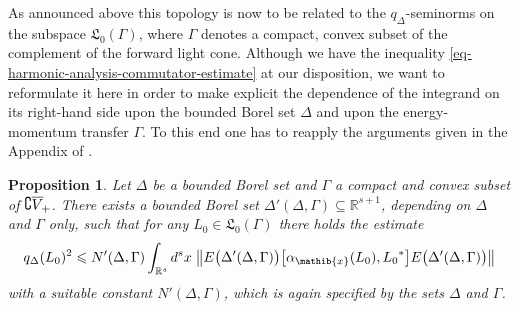 \documentclass[11pt,twoside,openright]{report}
\theoremstyle{definition}
\theoremstyle{plain}
\newtheorem{Pro}[Def]{Proposition}
\theoremstyle{remark}
\theoremstyle{assumption}
\newcommand{\bcomm}[2]{\bigl[ #1 , #2 \bigr]}
\newcommand{\bnorm}[1]{\bigl\lVert #1 \bigr\rVert}
\newcommand{\qD}{q_\Delta}
\newcommand{\qDx}[1]{q_\Delta ( #1 )}
\newcommand{\Lfrak}{\mathfrak{L}}
\newcommand{\Rs}{\mathbb{R}^s}
\newcommand{\Rsone}{\mathbb{R}^{s + 1}}
\newcommand{\fwcone}{\overline{V}_{\negthinspace +}}
\newcommand{\EDG}{E \bigl( \Delta' ( \Delta , \Gamma ) \bigr)}
\newcommand{\aibx}{\alpha_\mathib{x}}
\begin{document}
As announced above this topology is now to be related to the
$\qD$-seminorms on the subspace $\Lfrak_0 ( \Gamma )$, where $\Gamma$
denotes a compact, convex subset of the complement of the forward
light cone. Although we have the inequality
\eqref{eq-harmonic-analysis-commutator-estimate} at our disposition,
we want to reformulate it here in order to make explicit the
dependence of the integrand on its right-hand side upon the bounded
Borel set $\Delta$ and upon the energy-momentum transfer $\Gamma$. To
this end one has to reapply the arguments given in the Appendix of
\cite{buchholz:1990}.
\begin{Pro}
  Let $\Delta$ be a bounded Borel set and $\Gamma$ a compact and
  convex subset of $\complement \fwcone$. There exists a bounded Borel
  set $\Delta' ( \Delta , \Gamma ) \subseteq \Rsone$, depending on
  $\Delta$ and $\Gamma$ only, such that for any $L_0 \in \Lfrak_0 (
  \Gamma )$ there holds the estimate
  \begin{equation}
    \label{eq-harmonic-analysis-energy-momentum-bound}
    \qDx{L_0}^2 \leqslant N' ( \Delta , \Gamma ) \int_{\Rs} d^s x \;
    \bnorm{\EDG \bcomm{\aibx ( L_0 )}{{L_0}^*} \EDG}
  \end{equation}
  with a suitable constant $N' ( \Delta , \Gamma )$, which is again
  specified by the sets $\Delta$ and $\Gamma$.
\end{Pro}
\end{document}
